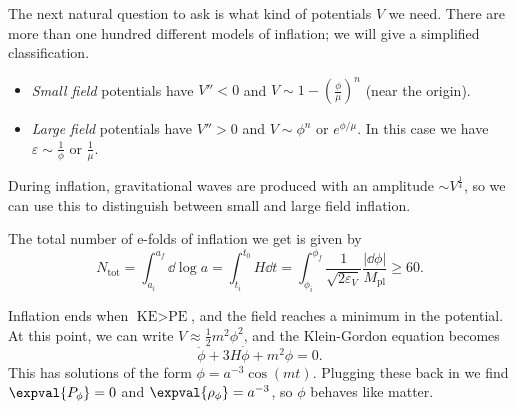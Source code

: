 \documentclass{jknotes}
\begin{document}
The next natural question to ask is what kind of potentials \(V\) we need. There are more than one hundred different models of inflation; we will give a simplified classification.
\begin{itemize}
    \item \emph{Small field} potentials have \(V'' < 0\) and \(V\sim 1-\left(\frac\phi\mu\right)^n\) (near the origin).
        \begin{figure}[H]
            \centering
        \end{figure}
    \item \emph{Large field} potentials have \(V''>0\) and \(V\sim \phi^n\) or \(e^{\phi/\mu}\). In this case we have \(\varepsilon \sim \frac{1}{\phi}\) or \(\frac{1}{\mu}\).
        \begin{figure}[H]
            \centering
        \end{figure}
\end{itemize}
During inflation, gravitational waves are produced with an amplitude \(\sim V^{\frac14}\), so we can use this to distinguish between small and large field inflation.

The total number of e-folds of inflation we get is given by
\begin{equation}
    N_{\text{tot}} = \int_{a_i}^{a_f}\dd{\log a} = \int^{t_0}_{t_i} H \dd{t} = \int_{\phi_i}^{\phi_f} \frac1{\sqrt{2\varepsilon_V}}\frac{|\dd{\phi}|}{M_{\text{pl}}} \ge 60.
\end{equation}

Inflation ends when \(\text{KE} > \text{PE}\), and the field reaches a minimum in the potential. At this point, we can write \(V \approx \frac12m^2\phi^2\), and the Klein-Gordon equation becomes
\begin{equation}
    \ddot\phi + 3H\dot\phi + m^2\phi = 0.
\end{equation}
This has solutions of the form \(\phi = a^{-3}\cos(mt)\). Plugging these back in we find \(\expval{P_\phi} = 0\) and \(\expval{\rho_\phi} = a^{-3}\), so \(\phi\) behaves like matter.
\end{document}
